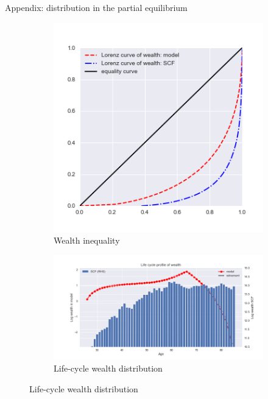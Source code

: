 \documentclass{beamer}
\begin{document}
\begin{frame}{Appendix: distribution in the partial equilibrium}
	\label{appendix:partial_eq}
		\begin{figure}[ht]
		\centering
		\begin{subfigure}[b]{0.30\textwidth}
			\caption{Wealth inequality}
			\includegraphics[width=\textwidth]{figures/lorenz_a_test.png}
		\end{subfigure}
		\begin{subfigure}[b]{0.6\textwidth}
			\caption{Life-cycle wealth distribution}
			\includegraphics[width=\textwidth]{figures/life_cycle_a_test.png}
		\end{subfigure} 
	\end{figure}
	\hyperlink{objectivemodelresults}{} 
\end{frame}
\end{document}
